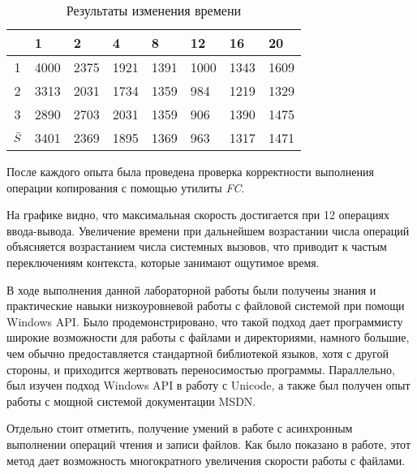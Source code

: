 \documentclass[a4paper,14pt]{extarticle}
\newcommand{\Code}[1]{\textit{#1}}
\begin{document}
\begin{table}[H]
    \centering
    \caption{Результаты изменения времени}
    \begin{tabularx}{\textwidth}{|c|X|X|X|X|X|X|X|}
        \hline
                  & 1 & 2 & 4 & 8 & 12 & 16 & 20 \\
        \hline
                1 & 4000 & 2375 & 1921 & 1391 & 1000 & 1343 & 1609 \\
        \hline
                2 & 3313 & 2031 & 1734 & 1359 & 984  & 1219 & 1329 \\
        \hline
                3 & 2890 & 2703 & 2031 & 1359 & 906  & 1390 & 1475 \\
        \hline
        $\Bar{S}$ & 3401 & 2369 & 1895 & 1369 & 963  & 1317 & 1471 \\
        \hline
    \end{tabularx}
\end{table}

После каждого опыта была проведена проверка корректности выполнения операции
копирования с помощью утилиты \Code{FC}.


На графике видно, что максимальная скорость достигается при 12 операциях
ввода-вывода. Увеличение времени при дальнейшем возрастании числа операций
объясняется возрастанием числа системных вызовов, что приводит к частым
переключениям контекста, которые занимают ощутимое время.


\clearpage



В ходе выполнения данной лабораторной работы были получены знания и практические навыки
низкоуровневой работы с файловой системой при помощи Windows API. Было
продемонстрировано, что такой подход дает программисту широкие возможности для
работы с файлами и директориями, намного большие, чем обычно предоставляется
стандартной библиотекой языков, хотя с другой стороны, и приходится жертвовать
переносимостью программы. Параллельно, был изучен подход Windows API в работу с
Unicode, а также был получен опыт работы с мощной системой документации MSDN.

Отдельно стоит отметить, получение умений в работе с асинхронным выполнении
операций чтения и записи файлов. Как было показано в работе, этот метод дает
возможность многократного увеличения скорости работы с файлами.
\end{document}
